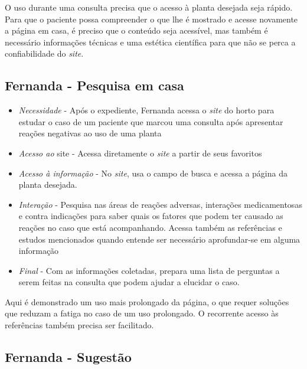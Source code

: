 O uso durante uma consulta precisa que o acesso à planta desejada seja rápido. Para que o paciente possa compreender o que lhe é mostrado e acesse novamente a página em casa, é preciso que o conteúdo seja acessível, mas também é necessário informações técnicas e uma estética científica para que não se perca a confiabilidade do \emph{site}.

\subsection{Fernanda - Pesquisa em casa}\label{fernanda---pesquisa-em-casa}

\begin{itemize}
\item
  \emph{Necessidade} - Após o expediente, Fernanda acessa o \emph{site} do horto para estudar o caso de um paciente que marcou uma consulta após apresentar reações negativas ao uso de uma planta
\item
  \emph{Acesso ao} site - Acessa diretamente o \emph{site} a partir de seus favoritos
\item
  \emph{Acesso à informação} - No \emph{site}, usa o campo de busca e acessa a página da planta desejada.
\item
  \emph{Interação} - Pesquisa nas áreas de reações adversas, interações medicamentosas e contra indicações para saber quais os fatores que podem ter causado as reações no caso que está acompanhando. Acessa também as referências e estudos mencionados quando entende ser necessário aprofundar-se em alguma informação
\item
  \emph{Final} - Com as informações coletadas, prepara uma lista de perguntas a serem feitas na consulta que podem ajudar a elucidar o caso.
\end{itemize}

Aqui é demonstrado um uso mais prolongado da página, o que requer soluções que reduzam a fatiga no caso de um uso prolongado. O recorrente acesso às referências também precisa ser facilitado.

\subsection{Fernanda - Sugestão}\label{fernanda---sugestao}

